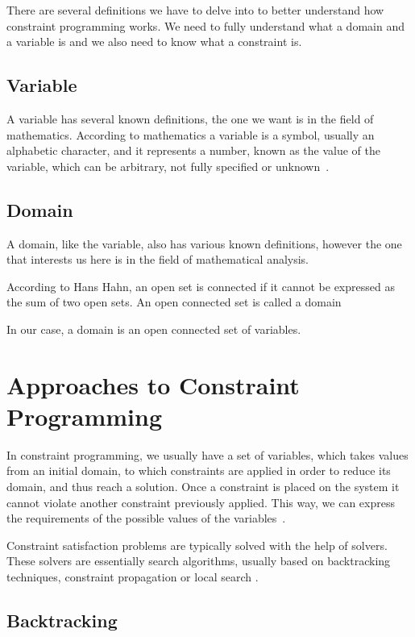 There are several definitions we have to delve into to better understand how constraint programming works. We need to fully understand what a domain and a variable is and we also need to know what a constraint is.

\subsection{Variable}
\label{variable}

A variable has several known definitions, the one we want is in the field of mathematics. According to mathematics a variable is a symbol, usually an alphabetic character, and it represents a number, known as the value of the variable, which can be arbitrary, not fully specified or unknown~\cite{Menger1954}.

\subsection{Domain}

A domain, like the variable, also has various known definitions, however the one that interests us here is in the field of mathematical analysis. 

According to Hans Hahn, an open set is connected if it cannot be expressed as the sum of two open sets. An open connected set is called a domain~\cite{Hahn1921} 

In our case, a domain is an open connected set of variables.

\section{Approaches to Constraint Programming}

In constraint programming, we usually have a set of variables, which takes values from an initial domain, to which constraints are applied in order to reduce its domain, and thus reach a solution. Once a constraint is placed on the system it cannot violate another constraint previously applied. This way, we can express the requirements of the possible values of the variables~\cite{Pearson1997}.

Constraint satisfaction problems are typically solved with the help of solvers. These solvers are essentially search algorithms, usually based on backtracking techniques\cite{Knuth1997}, constraint propagation \cite{Lecoutre2010} or local search \cite{Dechter2003}. 

\subsection{Backtracking}

